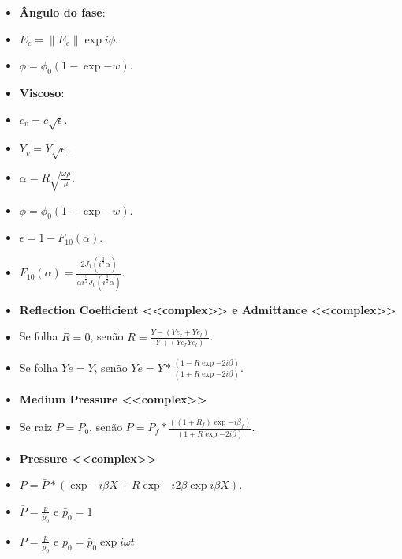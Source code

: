 \documentclass[10pt]{beamer}
\theoremstyle{remark}
\theoremstyle{definition}
\begin{document}
\begin{frame}[allowframebreaks]
\begin{itemize}
		\end{itemize}
		
		
		\framebreak
		
		\begin{itemize}
			\item \textbf{Ângulo do fase}:
			\item $ E_c = \|E_c\|\exp{i\phi}$.
			\item $ \phi = \phi_0 (1 - \exp{-w})$.
			
		\end{itemize}
		
		
		\framebreak
		
		\begin{itemize}
			\item \textbf{Viscoso}:
			\item $ c_v = c\sqrt{\epsilon}$.
			\item $ Y_v = Y\sqrt{\epsilon}$.
			\item $ \alpha = R \sqrt{\frac{\omega \rho}{\mu}}$.
			\item $ \phi = \phi_0 (1 - \exp{-w})$.
			\item $ \epsilon = 1 - F_{10}(\alpha)$.
			\item $ F_{10}(\alpha) = \frac{2J_1(i^{\frac{3}{2}} \alpha)}{\alpha i^{\frac{3}{2}} J_0(i^{\frac{3}{2}} \alpha)}$.
			
		\end{itemize}
		
		\framebreak
		
		\begin{itemize}
			\item \textbf{Reflection Coefficient <<complex>> e Admittance <<complex>>}
			\item Se folha $ R = 0 $, senão $ R = \frac{Y - (Ye_r + Ye_l)}{Y + (Ye_r Ye_l)}$.
			\item Se folha $ Ye = Y $, senão $ Ye = Y * \frac{(1 - R\exp{-2i\beta})}{(1 + R\exp{-2i\beta})}$.
			\item \textbf{Medium Pressure <<complex>>}
			\item Se raiz $ \bar{P} = \bar{P}_0 $, senão $ \bar{P} = \bar{P}_f * \frac{((1 + R_f)\exp{-i\beta_f})}{(1 + R\exp{-2i\beta})}$.
		\end{itemize}
		
		\framebreak
		
		\begin{itemize}
			\item \textbf{Pressure <<complex>>}
			\item $ P = \bar{P} * ( \exp{-i\beta X} + R\exp{-i2\beta}\exp{i\beta X})$.
			\item $ \bar{P} = \frac{\bar{p}}{\bar{p}_0}$ e $\bar{p}_0 = 1$
			\item $ P = \frac{p}{p_0}$ e $p_0 = \bar{p}_0 \exp{i\omega t}$
			

\end{itemize}
\end{frame}
\end{document}
